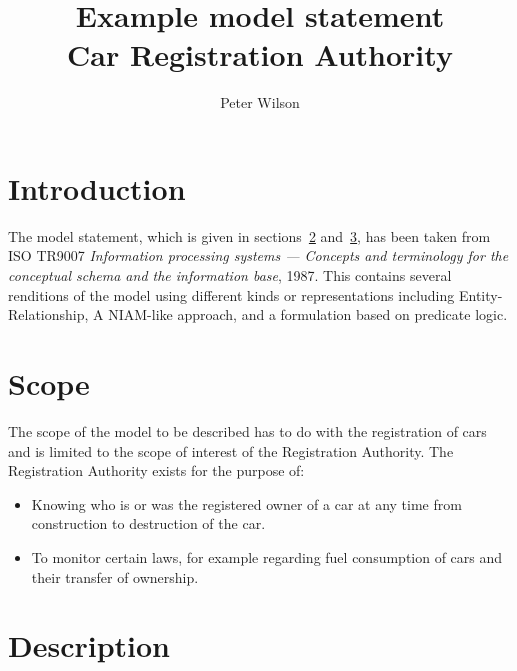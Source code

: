 \documentclass{article}
\title{Example model statement \\
       Car Registration Authority}
\author{Peter Wilson}
\date{}
\begin{document}
\maketitle
\tableofcontents
\clearpage


\section{Introduction}


   The model statement, which is given in sections~\ref{scope}
and~\ref{description}, has been taken from ISO TR9007 \textit{Information
processing systems --- Concepts and terminology for the conceptual
schema and the information base}, 1987. This contains several renditions
of the model using different kinds or representations including
Entity-Relationship, A NIAM-like approach, and a formulation based on
predicate logic.


\section{Scope} \label{scope}

The scope of the model to be described has to do with the registration of cars
and is limited to the scope of interest of the Registration Authority. The
Registration Authority exists for the purpose of:

\begin{itemize}

\item Knowing who is or was the registered owner of a car at any time from
construction to destruction of the car.

\item To monitor certain laws, for example regarding fuel consumption of cars
and their transfer of ownership.

\end{itemize}

\section{Description} \label{description}
\end{document}
